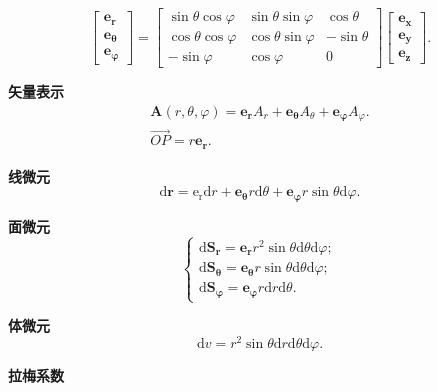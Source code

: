 \begin{equation}
    \begin{bmatrix}
        \bm{e_r}      \\
        \bm{e_\theta} \\
        \bm{e_\varphi}
    \end{bmatrix}=\begin{bmatrix}
        \sin\theta\cos\varphi & \sin\theta\sin\varphi & \cos\theta  \\
        \cos\theta\cos\varphi & \cos\theta\sin\varphi & -\sin\theta \\
        -\sin\varphi          & \cos\varphi           & 0
    \end{bmatrix}\begin{bmatrix}
        \bm{e_x} \\
        \bm{e_y} \\
        \bm{e_z}
    \end{bmatrix}.
\end{equation}

\textbf{矢量表示}
\begin{gather}
    \bm{A}(r,\theta,\varphi)=\bm{e_r}A_r+\bm{e_\theta}A_\theta+\bm{e_\varphi}A_\varphi. \\
    \overrightarrow{OP}=r\bm{e_r}.
\end{gather}

\textbf{线微元}
\begin{equation}
    \mathrm{d}\bm{r}=\mathrm{e_r}\mathrm{d}r+\bm{e_\theta}r\mathrm{d}\theta+\bm{e_\varphi}r\sin\theta\mathrm{d}\varphi.
\end{equation}

\textbf{面微元}
\begin{equation}
    \begin{cases}
        \mathrm{d}\bm{S_r}=\bm{e_r}r^2\sin\theta\mathrm{d}\theta\mathrm{d}\varphi;         \\
        \mathrm{d}\bm{S_\theta}=\bm{e_\theta}r\sin\theta\mathrm{d}\theta\mathrm{d}\varphi; \\
        \mathrm{d}\bm{S_\varphi}=\bm{e_\varphi}r\mathrm{d}r\mathrm{d}\theta.
    \end{cases}
\end{equation}

\textbf{体微元}
\begin{equation}
    \mathrm{d}v=r^2\sin\theta\mathrm{d}r\mathrm{d}\theta\mathrm{d}\varphi.
\end{equation}

\textbf{拉梅系数}

